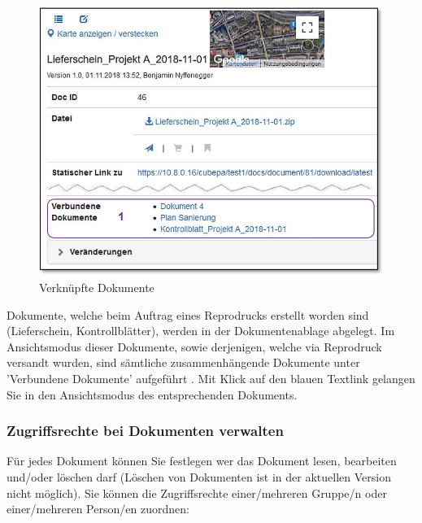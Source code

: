 \begin{figure}   %
  \vspace{-25pt}      %
  \begin{center}
    \includegraphics[width=1\linewidth]{../chapters/11_Dokumentenablage/pictures/repro_verk_Dokumente.jpg}
  \end{center}
  \vspace{-20pt}
  \caption{Verknüpfte Dokumente}
  \vspace{-10pt}
\end{figure}
Dokumente, welche beim Auftrag eines Reprodrucks erstellt worden sind (Lieferschein, Kontrollblätter), werden in der Dokumentenablage abgelegt. Im Ansichtsmodus dieser Dokumente, sowie derjenigen, welche via Reprodruck versandt wurden, sind sämtliche zusammenhängende Dokumente unter 'Verbundene Dokumente' aufgeführt . Mit Klick auf den blauen Textlink gelangen Sie in den Ansichtsmodus des entsprechenden Dokuments.

\pagebreak
\subsubsection{Zugriffsrechte bei Dokumenten verwalten}
\label{bkm:Ref442869495}

Für jedes Dokument können Sie festlegen wer das Dokument lesen, bearbeiten und/oder löschen darf (Löschen von Dokumenten ist in der aktuellen Version nicht möglich). Sie können die Zugriffsrechte einer/mehreren Gruppe/n oder einer/mehreren Person/en zuordnen:

